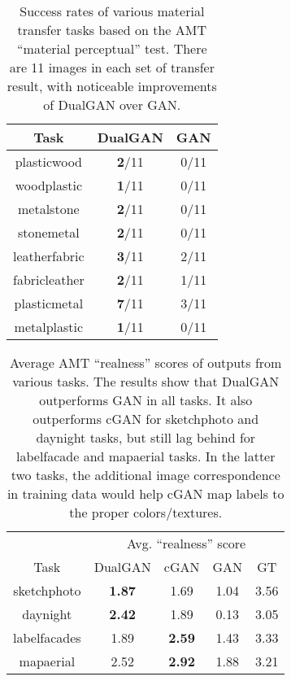 \begin{table}
\begin{center}
\begin{tabular}{|c|c|c|}
\hline
Task  & DualGAN  &  GAN \\
\hline\hline
plasticwood &  \textbf{2}/11 & 0/11 \\
\hline
woodplastic &  \textbf{1}/11 & 0/11 \\
\hline
metalstone&   \textbf{2}/11 & 0/11 \\
\hline
stonemetal &   \textbf{2}/11 & 0/11 \\
\hline
leatherfabric &  \textbf{3}/11 & 2/11 \\
\hline
fabricleather &  \textbf{2}/11 & 1/11 \\
\hline
plasticmetal &   \textbf{7}/11 & 3/11 \\
\hline
metalplastic &   \textbf{1}/11 & 0/11 \\
\hline
\end{tabular}
\caption{Success rates of various material transfer tasks based on the AMT ``material perceptual'' test. 
There are 11 images in each set of transfer result, with noticeable improvements of DualGAN over GAN.} 
\label{table:material}
\end{center}
\end{table}



\begin{table}
\tabcolsep=0.11cm
\begin{center}
\begin{tabular}{c|cccc}
\hline
	   &   \multicolumn{4}{|c}{Avg. ``realness'' score }\\
		  Task & DualGAN  &  cGAN\cite{isola2016image} & GAN & GT\\
\hline\hline

sketchphoto & \textbf{1.87 }&  1.69   & 1.04  & 3.56 \\
\hline
daynight &  \textbf{2.42 } & 1.89   &  0.13  & 3.05  \\
\hline
labelfacades & 1.89  &   \textbf{2.59 } & 1.43  & 3.33 \\
\hline
mapaerial & 2.52 &  \textbf{2.92 } & 1.88  &  3.21  \\
\hline
\end{tabular}
\caption{Average AMT ``realness'' scores of outputs from various tasks. The results show that 
DualGAN outperforms GAN in all tasks. It also outperforms cGAN for sketchphoto 
and daynight tasks, but still lag behind for labelfacade and 
mapaerial tasks. In the latter two tasks, the additional image correspondence in 
training data would help cGAN map labels to the proper colors/textures.}
\label{table:score}
\end{center}
\end{table}

